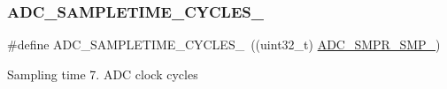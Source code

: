 \subsubsection{\texorpdfstring{A\+D\+C\+\_\+\+S\+A\+M\+P\+L\+E\+T\+I\+M\+E\+\_\+C\+Y\+C\+L\+E\+S\+\_}{ADC\_SAMPLETIME\_7CYCLES\_5}}
{\footnotesize\ttfamily \#define A\+D\+C\+\_\+\+S\+A\+M\+P\+L\+E\+T\+I\+M\+E\+\_\+C\+Y\+C\+L\+E\+S\+\_~((uint32\+\_\+t) \hyperlink{group___peripheral___registers___bits___definition_ga694f8b1e1e5410a1a60484f4857b8b2d}{A\+D\+C\+\_\+\+S\+M\+P\+R\+\_\+\+S\+M\+P\+\_})}

Sampling time 7. A\+DC clock cycles 